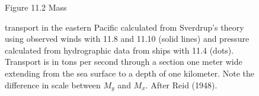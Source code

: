 \begin{figure}[t!]
\footnotesize
Figure 11.2 Mass \rule{0mm}{3ex}transport
in the eastern Pacific calculated from Sverdrup's theory using
observed winds with 11.8 and 11.10 (solid lines) and pressure
calculated from hydrographic data from ships with 11.4 (dots). Transport is in tons per
second through a section one meter wide extending from the sea surface
to a depth of one kilometer. Note the difference in scale between
$M_y$ and $M_x$. After Reid (1948).
\label{fig:windpacific}
\vspace{-4ex}
\end{figure}

